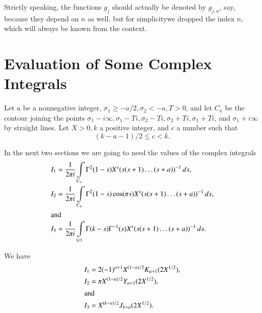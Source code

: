 Strictly speaking, the functions $g_j$ should actually be denoted by
$g_{j,n}$, say, because they depend on $n$ as well, but for
simplicity\pageoriginale we dropped the index $n$, which will always
be known from the context. 

\section{Evaluation of Some Complex Integrals}\label{chap1:sec1.4} 

Let $a$ be a nonnegative integer, $\sigma_1\geq -a/2, \sigma_2 < -a,
T>0$, and let $C_a$ be the contour joining the points $\sigma_1
-i\infty, \sigma_1-Ti, \sigma_2-Ti, \sigma_2+Ti, \sigma_1+Ti$, and
$\sigma_1+ i\infty$ by straight lines. Let $X>0,k$ a positive
integer, and $c$ a number such that 
$$
(k-a-1)/2\leq c<k.
$$

In the next two sections we are going to need the values of the
complex integrals
\begin{align}
I_1 &= \frac{1}{2\pi i}\int\limits_{C_a}\Gamma^2(1-s)X^s(s (s+1)\ldots
(s+a))^{-1} \,ds,\label{chap1:eq1.4.1}\\
I_2 &= \frac{1}{2\pi i}\int\limits_{C_a}\Gamma^2(1-s)\cos(\pi s)
X^s(s(s+1)\ldots(s+a))^{-1}\,ds,\label{chap1:eq1.4.2}\\
\intertext{and}
I_3 &= \frac{1}{2\pi i}\int\limits_{(c)}\Gamma(k-s)\Gamma^{-1}
(s)X^s(s(s+1)\ldots(s+a))^{-1}\,ds.\label{chap1:eq1.4.3}
\end{align}

\begin{lem}\label{chap1:lem1.5}
We have
\begin{align}
I_1 &= 2(-1)^{a+1}X^{(1-a)/2}K_{a+1}
(2X^{1/2}),\label{chap1:eq1.4.4}\\
I_2 &= \pi X^{(1-a)/2}Y_{a+1}(2X^{1/2}),\label{chap1:eq1.4.5}\\
\intertext{and}
I_3 &= X^{(k-a)/2}J_{k+a}(2X^{1/2}).\label{chap1:eq1.4.6} 
\end{align}
\end{lem}

